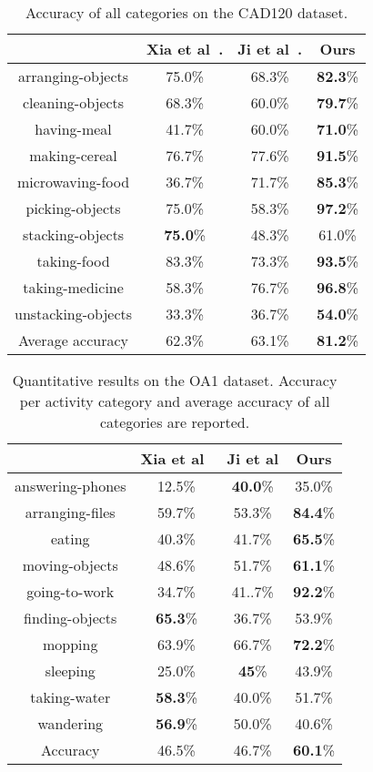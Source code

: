 \documentclass{sig-alternate}
\begin{document}
\begin{table}[!htbp]
\center
\begin{tabular}{|c|c|c|c|}
\hline
\hline
& Xia et al~\cite{DSTIP}. & Ji et al~\cite{3DCNNPAMI}. & Ours \\
\hline
\hline
arranging-objects & 75.0\% & 68.3\% & \textbf{82.3}\% \\
cleaning-objects & 68.3\%  & 60.0\% & \textbf{79.7}\% \\
having-meal & 41.7\%  & 60.0\% & \textbf{71.0}\% \\
making-cereal & 76.7\% & 77.6\% & \textbf{91.5}\% \\
microwaving-food &  36.7\% & 71.7\% & \textbf{85.3}\% \\
picking-objects & 75.0\% & 58.3\% & \textbf{97.2}\% \\
stacking-objects & \textbf{75.0}\% & 48.3\% & 61.0\% \\
taking-food & 83.3\% & 73.3\% & \textbf{93.5}\% \\
taking-medicine & 58.3\%  & 76.7\% & \textbf{96.8}\% \\
unstacking-objects & 33.3\% & 36.7\% & \textbf{54.0}\% \\
\hline
\hline
Average accuracy  & 62.3\% & 63.1\% & \textbf{81.2}\% \\
\hline
\end{tabular}
\caption{Accuracy of all categories on the CAD120 dataset. }
\label{tab:cad120}
\end{table}


\begin{table}[!hbp]
\center
\begin{tabular}{|c|c|c|c|}
\hline
\hline
& Xia et al~\cite{DSTIP} & Ji et al\cite{3DCNNPAMI} & Ours \\
\hline
\hline
answering-phones & 12.5\% & \textbf{40.0}\% & 35.0\% \\
arranging-files & 59.7\% & 53.3\% & \textbf{84.4}\% \\
eating & 40.3\% & 41.7\% & \textbf{65.5}\%\\
moving-objects & 48.6\% & 51.7\% & \textbf{61.1}\% \\
going-to-work & 34.7\% & 41..7\% & \textbf{92.2}\% \\
finding-objects & \textbf{65.3}\% & 36.7\% & 53.9\% \\
mopping & 63.9\% & 66.7\% & \textbf{72.2}\% \\
sleeping & 25.0\% & \textbf{45}\% & 43.9\% \\
taking-water & \textbf{58.3}\% & 40.0\% & 51.7\% \\
wandering & \textbf{56.9}\% & 50.0\% & 40.6\% \\
\hline
\hline
Accuracy & 46.5\% & 46.7\% & \textbf{60.1}\% \\
\hline
\end{tabular}
\caption{ Quantitative results on the OA1 dataset.  Accuracy per activity category and average accuracy of all categories are reported.}
\label{tab:hao1}
\end{table}
\end{document}
